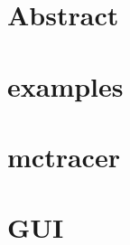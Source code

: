 \documentclass{article}
\begin{document}
\maketitle
\tableofcontents
\newpage

\section{Abstract} 
\section{examples} 
\section{mctracer} 
\section{GUI} 
\end{document}
